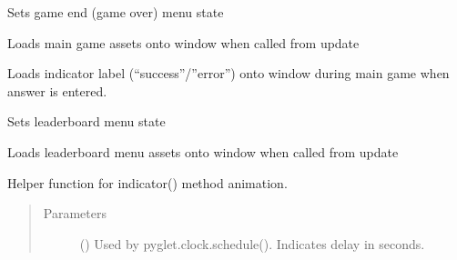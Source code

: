 \documentclass[letterpaper,10pt,english]{sphinxmanual}
\begin{document}
\begin{fulllineitems}
\begin{fulllineitems}
\end{fulllineitems}



\begin{fulllineitems}
Sets game end (game over) menu state

\end{fulllineitems}



\begin{fulllineitems}
Loads main game assets onto window when called from update

\end{fulllineitems}



\begin{fulllineitems}
Loads indicator label (“success”/”error”) onto
window during main game when answer is entered.

\end{fulllineitems}



\begin{fulllineitems}
Sets leaderboard menu state

\end{fulllineitems}



\begin{fulllineitems}
Loads leaderboard menu assets onto window when called from update

\end{fulllineitems}



\begin{fulllineitems}
Helper function for indicator() method animation.
\begin{quote}\begin{description}
\item[{Parameters}] \leavevmode
{} () \textendash{} Used by pyglet.clock.schedule(). Indicates delay in seconds.


\end{description}
\end{quote}
\end{fulllineitems}
\end{fulllineitems}
\end{document}
